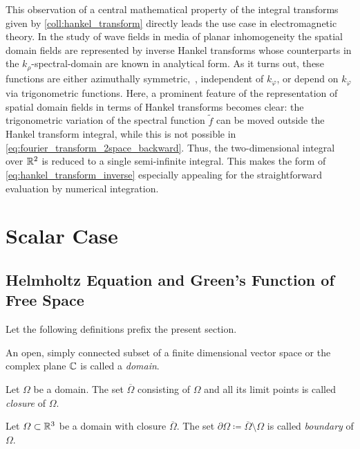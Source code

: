 This observation of a central mathematical property of the integral transforms
given by \cref{coll:hankel_transform} directly leads the use case in
electromagnetic theory.
In the study of wave fields in media of planar inhomogeneity the spatial domain
fields are represented by inverse Hankel transforms whose counterparts in the 
$k_\rho$-spectral-domain are known in analytical form.
As it turns out, these functions are either azimuthally symmetric,~\ie,
independent of $k_\varphi$, or depend on $k_\varphi$ via trigonometric
functions. 
Here, a prominent feature of the representation of spatial domain fields in
terms of Hankel transforms becomes clear: the trigonometric variation of the
spectral function $\tilde{f}$
can be moved outside the Hankel transform integral, while this is not
possible in \eqref{eq:fourier_transform_2space_backward}.
Thus, the two-dimensional integral over $\mathbb{R}^2$ is reduced to a single
semi-infinite integral.
This makes the form of \eqref{eq:hankel_transform_inverse} especially appealing
for the straightforward evaluation by numerical integration.







\chapter{Scalar Case}
\label{ch:scalar_case}







\section{Helmholtz Equation and Green's Function of Free Space}
\label{sec:helmholtz_eq_and_gf}

Let the following definitions prefix the present section.
\begin{definition}[Domain]
	An open, simply connected subset of a finite dimensional vector space or
	the complex plane $\mathbb{C}$ is
	called a \emph{domain}.
\end{definition}
\begin{definition}[Closure]
	Let $\Omega$ be a domain.
	The set $\overline{\Omega}$ consisting of $\Omega$ and all its limit points
	is called \emph{closure} of $\Omega$.
\end{definition}
\begin{definition}[Boundary]
	Let $\Omega \subset \mathbb{R}^3$ be a domain with closure $\overline{\Omega}$.
	The set $\partial\Omega \coloneqq \overline{\Omega}\setminus\Omega$
	is called \emph{boundary} of $\Omega$.
\end{definition}

